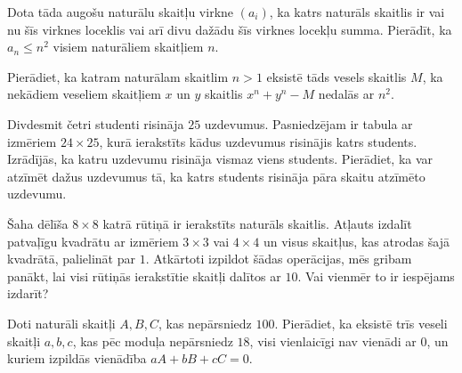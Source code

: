 \documentclass[a4paper,12pt]{article}
\begin{document}
\vspace{10pt}
\begin{problem}
Dota tāda augošu naturālu skaitļu virkne $\left( a_i \right)$, 
ka katrs naturāls skaitlis ir vai nu šīs virknes loceklis 
vai arī divu dažādu šīs virknes locekļu summa. Pierādīt, ka $a_n \leq n^2$  
visiem naturāliem skaitļiem $n$.
\end{problem}



\vspace{10pt}
\begin{problem}
Pierādiet, ka katram naturālam skaitlim $n>1$  
eksistē tāds vesels skaitlis $M$, ka nekādiem veseliem skaitļiem 
$x$ un $y$ skaitlis $x^n + y^n - M$ nedalās ar $n^2$.
\end{problem}



\vspace{10pt}
\begin{problem}
Divdesmit četri studenti risināja $25$ uzdevumus. 
Pasniedzējam ir tabula ar izmēriem $24 \times 25$, 
kurā ierakstīts kādus uzdevumus risinājis katrs students. 
Izrādījās, ka katru uzdevumu risināja vismaz viens students. 
Pierādiet, ka var atzīmēt dažus uzdevumus tā, ka katrs 
students risināja pāra skaitu atzīmēto uzdevumu.
\end{problem}




\vspace{10pt}
\begin{problem}
Šaha dēlīša $8 \times 8$ katrā rūtiņā ir ierakstīts naturāls skaitlis. 
Atļauts izdalīt patvaļīgu kvadrātu ar izmēriem $3 \times 3$  
vai $4 \times 4$  un visus skaitļus, kas atrodas šajā kvadrātā, 
palielināt par $1$. 
Atkārtoti izpildot šādas operācijas, mēs gribam panākt, 
lai visi rūtiņās ierakstītie skaitļi dalītos ar $10$. 
Vai vienmēr to ir iespējams izdarīt?
\end{problem}




\vspace{10pt}
\begin{problem}
Doti naturāli skaitļi $A,B,C$, kas nepārsniedz $100$. 
Pierādiet, ka eksistē trīs veseli skaitļi $a,b,c$, 
kas pēc moduļa nepārsniedz $18$, 
visi vienlaicīgi nav vienādi ar $0$, un kuriem izpildās vienādība
$aA + bB + cC = 0$.
\end{problem}
\end{document}
